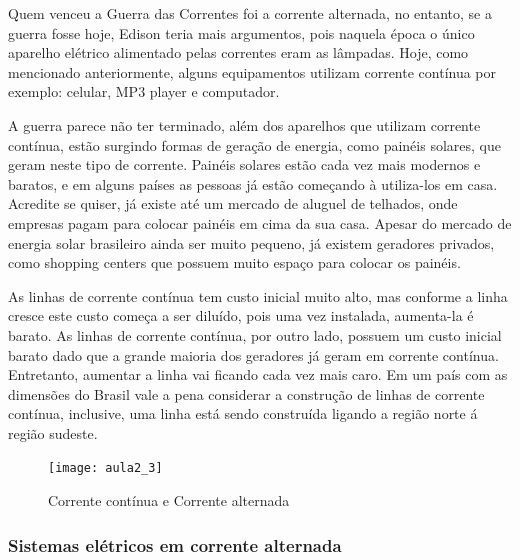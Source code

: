Quem venceu a Guerra das Correntes foi a corrente alternada, no entanto, se a guerra fosse hoje, Edison teria mais argumentos, pois naquela época o único aparelho elétrico alimentado pelas correntes eram as lâmpadas. Hoje, como mencionado anteriormente, alguns equipamentos utilizam corrente contínua por exemplo:
celular, MP3 player e computador.

A guerra parece não ter terminado, além dos aparelhos que utilizam corrente contínua, estão surgindo formas de geração de energia, como painéis solares, que geram neste tipo de corrente. Painéis solares estão cada vez mais modernos e baratos, e em alguns países as pessoas já estão começando à utiliza-los em casa. Acredite se quiser, já existe até um mercado de aluguel de telhados, onde empresas pagam para colocar painéis em cima da sua casa. Apesar do mercado de energia solar brasileiro ainda ser muito pequeno, já existem geradores privados, como shopping centers que possuem muito espaço para colocar os painéis. 

As linhas de corrente contínua tem custo inicial muito alto, mas conforme a linha cresce este custo começa a ser diluído, pois uma vez instalada, aumenta-la é barato. As linhas de corrente contínua, por outro lado, possuem um custo inicial barato dado que a grande maioria dos geradores já geram em corrente contínua. Entretanto, aumentar a linha vai ficando cada vez mais caro. Em um país com as dimensões do Brasil vale a pena considerar a construção de linhas de corrente contínua, inclusive, uma linha está sendo construída ligando a região norte á região sudeste. 

\begin{figure}[H]
\begin{centering}
\texttt{[image: aula2\_3]}\protect\caption{\label{fig:aula2_3} Corrente contínua e Corrente alternada }
\end{centering}

\end{figure}

\subsubsection{Sistemas elétricos em corrente alternada}

